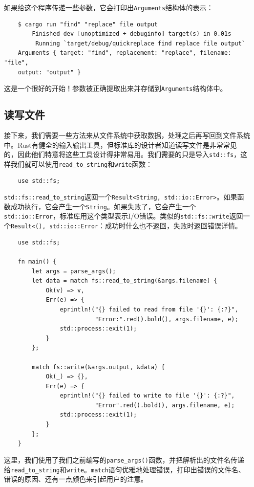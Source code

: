 如果给这个程序传递一些参数，它会打印出\texttt{Arguments}结构体的表示：
\begin{verbatim}
    $ cargo run "find" "replace" file output
        Finished dev [unoptimized + debuginfo] target(s) in 0.01s
         Running `target/debug/quickreplace find replace file output`
    Arguments { target: "find", replacement: "replace", filename: "file",
    output: "output" }
\end{verbatim}

这是一个很好的开始！参数被正确提取出来并存储到\texttt{Arguments}结构体中。

\subsection{读写文件}
接下来，我们需要一些方法来从文件系统中获取数据，处理之后再写回到文件系统中。Rust有健全的输入输出工具，但标准库的设计者知道读写文件是非常常见的，因此他们特意将这些工具设计得非常易用。我们需要的只是导入\texttt{std::fs}，这样我们就可以使用\texttt{read\_to\_string}和\texttt{write}函数：
\begin{verbatim}
    use std::fs;
\end{verbatim}

\texttt{std::fs::read\_to\_string}返回一个\texttt{Result<String, std::io::Error>}。如果函数成功执行，它会产生一个\texttt{String}。如果失败了，它会产生一个\texttt{std::io::Error}，标准库用这个类型表示I/O错误。类似的\texttt{std::fs::write}返回一个\texttt{Result<(), std::io::Error}：成功时什么也不返回，失败时返回错误详情。

\begin{verbatim}
    use std::fs;

    fn main() {
        let args = parse_args();
        let data = match fs::read_to_string(&args.filename) {
            Ok(v) => v,
            Err(e) => {
                eprintln!("{} failed to read from file '{}': {:?}",
                          "Error:".red().bold(), args.filename, e);
                std::process::exit(1);
            }
        };

        match fs::write(&args.output, &data) {
            Ok(_) => {},
            Err(e) => {
                eprintln!("{} failed to write to file '{}': {:?}",
                          "Error".red().bold(), args.filename, e);
                std::process::exit(1);
            }
        };
    }
\end{verbatim}

这里，我们使用了我们之前编写的\texttt{parse\_args()}函数，并把解析出的文件名传递给\texttt{read\_to\_string}和\texttt{write}。\texttt{match}语句优雅地处理错误，打印出错误的文件名、错误的原因、还有一点颜色来引起用户的注意。

